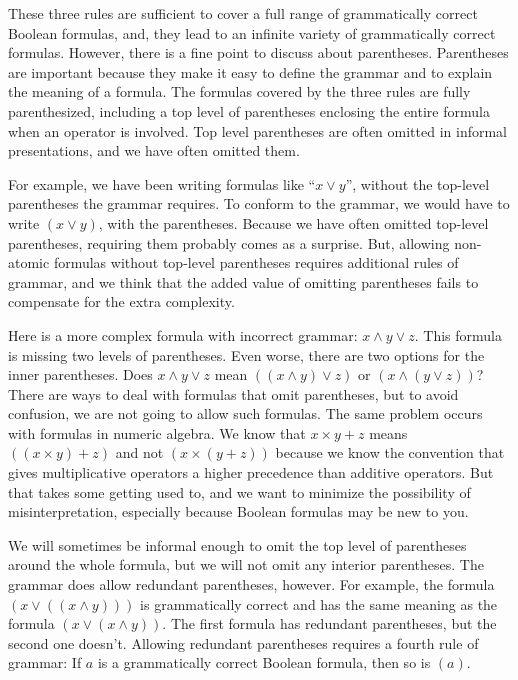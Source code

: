 These three rules are sufficient to
cover a full range of grammatically correct Boolean formulas,
and, they lead to an infinite variety of grammatically correct formulas.
However, there is a fine point to discuss about parentheses.
Parentheses are important because they make it easy to define
the grammar and to explain the meaning of a formula.
The formulas covered by the three rules are fully parenthesized,
including a top level of parentheses enclosing the entire formula
when an operator is involved.
Top level parentheses are often omitted in informal presentations,
and we have often omitted them.

For example, we have been writing formulas like ``$x \vee y$'',
without the top-level parentheses
the grammar requires.
To conform to the grammar,
we would have to write $(x \vee y)$, with the parentheses.
Because we have often omitted top-level parentheses,
requiring them probably comes as a surprise.
But, allowing non-atomic formulas without top-level parentheses
requires additional rules of grammar,
and we think that the added value of omitting parentheses
fails to compensate for the extra complexity.

Here is a more complex formula with incorrect grammar:
$x \wedge y \vee z$. This formula is missing two levels of parentheses.
Even worse, there are two options for the inner parentheses.
Does $x \wedge y \vee z$ mean $((x \wedge y) \vee z)$ or $(x \wedge (y \vee z))$?
There are ways to deal with formulas that omit parentheses,
but to avoid confusion, we are not going to allow such formulas.
The same problem occurs with formulas in numeric algebra.
We know that $x \times y + z$ means $((x \times y) + z)$ and
not $(x \times (y + z))$ because we know the convention that
gives multiplicative operators a higher precedence than additive operators.
But that takes some getting used to, and we want to
minimize the possibility of misinterpretation,
especially because Boolean formulas may be new to you.

We will sometimes be informal enough to omit
the top level of parentheses around the whole formula,
but we will not omit any interior parentheses.
The grammar does allow redundant parentheses, however.
For example, the formula $(x \vee ((x \wedge y)))$
is grammatically correct and has the same meaning as the formula
$(x \vee (x \wedge y))$.
The first formula has redundant parentheses,
but the second one doesn't.
Allowing redundant parentheses requires a fourth rule of grammar:
If $a$ is a grammatically correct Boolean formula, then so is $(a)$.

